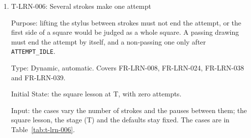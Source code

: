 \documentclass[12pt, titlepage]{article}
\newcommand{\testitem}[1]{\item #1\par\nopagebreak}
\begin{document}
\begin{enumerate}
Output: the expected output of each case is in its row of
Table~\ref{tab:t-lrn-005}; the test passes when every case gives it.

Test Case Derivation: (a) to (c) are the fit criterion's one-stroke and
multi-stroke samples. (d) follows H-AHM-002, which asks that legitimately
repeated strokes survive duplicate removal. (e) is H-AHM-001, missed
pointer samples. The 0.01-pixel allowance covers floating-point storage
only.

How test will be performed: Playwright replays each file and reads the
captured strokes from the saved attempt record. A Vitest test sends the
same event lists to the input handler directly.

\testitem{T-LRN-006: Several strokes make one attempt}

Purpose: lifting the stylus between strokes must not end the attempt, or
the first side of a square would be judged as a whole square. A passing
drawing must end the attempt by itself, and a non-passing one only after
\texttt{ATTEMPT\_IDLE}.

Type: Dynamic, automatic. Covers FR-LRN-008, FR-LRN-024, FR-LRN-038 and
FR-LRN-039.

Initial State: the square lesson at T, with zero attempts.

Input: the cases vary the number of strokes and the pauses between them;
the square lesson, the stage (T) and the defaults stay fixed. The cases are
in Table~\ref{tab:t-lrn-006}.


\end{enumerate}
\end{document}

